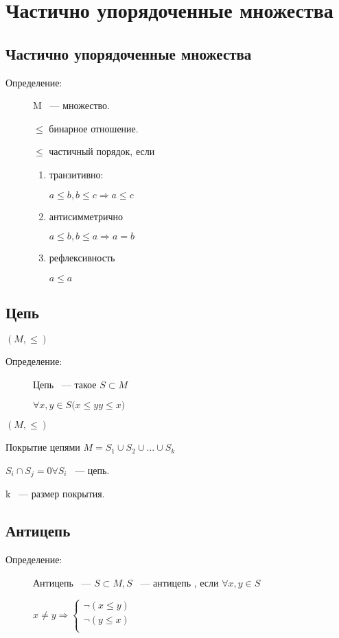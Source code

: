 \documentclass[12pt]{article}
\begin{document}
\section{Частично упорядоченные множества}

\subsection{Частично упорядоченные множества}
\begin{description}
\item[Определение:]  M ~--- множество. 

$\le$ бинарное отношение.

$\le$ частичный порядок, если

\begin{enumerate}
\item транзитивно:

$a \le b, b \le c \Rightarrow a \le c$

\item антисимметрично

$a \le b, b \le a \Rightarrow a = b$

\item рефлексивность

$a \le a$
\end{enumerate}
\end{description}

\subsection{Цепь}

$(M, \le)$

\begin{description}
\item[Определение:] Цепь ~--- такое $S \subset M$

$\forall x, y \in S (x \le y $$ y \le x)$
\end{description}

$(M, \le)$

Покрытие цепями $M = S_1 \cup S_2 \cup \ldots \cup  S_k$

$S_i \cap S_j = 0 \forall S_i$ ~--- цепь.

k ~--- размер покрытия.

\subsection{Антицепь} 

\begin{description}
\item[Определение:] Антицепь ~---  $S \subset M, S$ ~--- антицепь , если $\forall x, y \in S$

$x \ne y \Rightarrow \begin{cases} \neg (x \le y)\\ \neg (y \le x)\\ \end{cases}$

\end{description}
\end{document}
